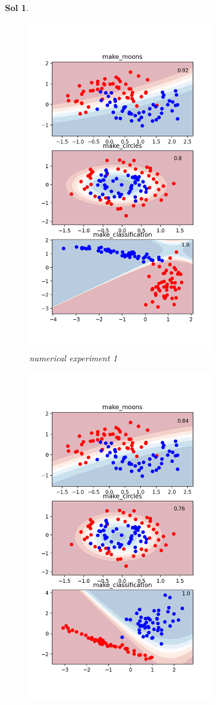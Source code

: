 \documentclass[UTF8,a4paper,11pt]{ctexart}
\newtheorem{sol}{Sol}[section]
\begin{document}
\begin{sol}
\begin{figure}[H]
	\includegraphics[width=0.7\textwidth,height=1.2\textwidth]{1.png}
	\caption{numerical experiment 1}
\end{figure}
\begin{figure}[H]
	\centering
	\includegraphics[width=0.7\textwidth,height=1.2\textwidth]{2.png}

\end{figure}
\end{sol}
\end{document}
